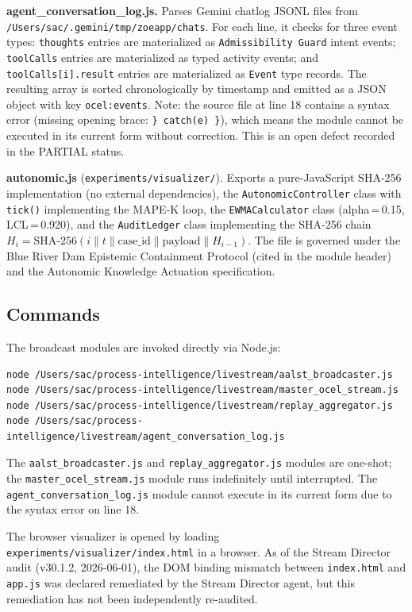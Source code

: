 \textbf{agent\_conversation\_log.js.} Parses Gemini chatlog JSONL files from
\texttt{/Users/sac/.gemini/tmp/zoeapp/chats}. For each line, it checks for three
event types: \texttt{thoughts} entries are materialized as \texttt{Admissibility Guard}
intent events; \texttt{toolCalls} entries are materialized as typed activity events;
and \texttt{toolCalls[i].result} entries are materialized as \texttt{Event} type
records. The resulting array is sorted chronologically by timestamp and emitted as
a JSON object with key \texttt{ocel:events}. Note: the source file at line 18
contains a syntax error (missing opening brace: \texttt{\} catch(e) \}}), which means
the module cannot be executed in its current form without correction. This is an open
defect recorded in the PARTIAL status.

\textbf{autonomic.js} (\texttt{experiments/visualizer/}).
Exports a pure-JavaScript SHA-256 implementation (no external dependencies), the
\texttt{AutonomicController} class with \texttt{tick()} implementing the MAPE-K loop,
the \texttt{EWMACalculator} class (alpha\,=\,0.15, LCL\,=\,0.920), and the
\texttt{AuditLedger} class implementing the SHA-256 chain
$H_i = \text{SHA-256}(i \| t \| \text{case\_id} \| \text{payload} \| H_{i-1})$.
The file is governed under the Blue River Dam Epistemic Containment Protocol
(cited in the module header) and the Autonomic Knowledge Actuation specification.

\subsection{Commands}
\label{sec:livestream-impl-commands}

The broadcast modules are invoked directly via Node.js:
\begin{verbatim}
node /Users/sac/process-intelligence/livestream/aalst_broadcaster.js
node /Users/sac/process-intelligence/livestream/master_ocel_stream.js
node /Users/sac/process-intelligence/livestream/replay_aggregator.js
node /Users/sac/process-intelligence/livestream/agent_conversation_log.js
\end{verbatim}

The \texttt{aalst\_broadcaster.js} and \texttt{replay\_aggregator.js} modules are
one-shot; the \texttt{master\_ocel\_stream.js} module runs indefinitely until
interrupted. The \texttt{agent\_conversation\_log.js} module cannot execute in
its current form due to the syntax error on line 18.

The browser visualizer is opened by loading
\texttt{experiments/visualizer/index.html} in a browser. As of the Stream Director
audit (v30.1.2, 2026-06-01), the DOM binding mismatch between \texttt{index.html}
and \texttt{app.js} was declared remediated by the Stream Director agent, but this
remediation has not been independently re-audited.

